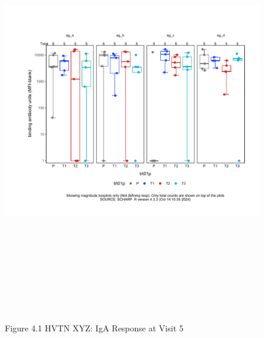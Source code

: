\documentclass[12pt]{article}
\begin{document}
\begin{figure}[H]

{\centering \includegraphics[width=8.75in,height=7.25in]{test_cases_files/figure-latex/unnamed-chunk-8-1} 

}

\caption[Figure 4.1 boxplot (pos. response boxplots)]{Figure 4.1 HVTN XYZ: IgA Response at Visit 5}\label{fig:unnamed-chunk-8}
\end{figure}
\clearpage
\end{document}
